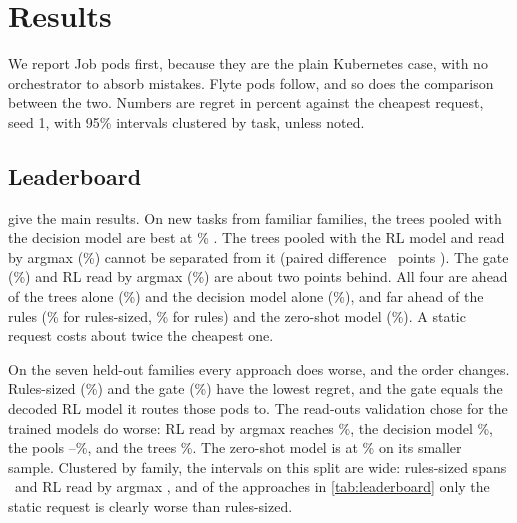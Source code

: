 \section{Results}
\label{sec:results}




We report Job pods first, because they are the plain Kubernetes case, with no orchestrator to absorb mistakes.
Flyte pods follow, and so does the comparison between the two. Numbers are regret in percent against the cheapest
request, seed 1, with 95\% intervals clustered by task, unless noted.

\subsection{Leaderboard}
\label{sec:res-lead}

 give the main results. On new tasks from familiar families, the trees pooled
with the decision model are best at \rTestPoolDec\% \ciTestPoolDec. The trees pooled with the RL model and read by
argmax (\rTestPoolRLArg\%) cannot be separated from it (paired difference \vbTestPoolRLArg\ points
\vbTestPoolRLArgCI). The gate (\rTestGate\%) and RL read by argmax (\rTestRLArg\%) are about two points behind.
All four are ahead of the trees alone (\rTestTrees\%) and the decision model alone (\rTestDec\%), and far ahead of
the rules (\rTestSized\% for rules-sized, \rTestRules\% for rules) and the zero-shot model (\rTestZS\%). A static
request costs about twice the cheapest one.

On the seven held-out families every approach does worse, and the order changes. Rules-sized (\rUnseenSized\%) and
the gate (\rUnseenGate\%) have the lowest regret, and the gate equals the decoded RL model it routes those pods to.
The read-outs validation chose for the trained models do worse: RL read by argmax reaches \rUnseenRLArg\%, the
decision model \rUnseenDec\%, the pools \rUnseenPoolDec--\rUnseenPoolRLArg\%, and the trees \rUnseenTrees\%. The
zero-shot model is at \rUnseenZS\% on its smaller sample. Clustered by family, the intervals on this split are
wide: rules-sized spans \ciFamUnseenSized\ and RL read by argmax \ciFamUnseenRLArg, and of the approaches in
\cref{tab:leaderboard} only the static request is clearly worse than rules-sized.

\begin{table}[tbp]
\centering\small
\caption{Regret (\%) on Job pods for seed 1, with 95\% intervals clustered by task, and for the unseen split also
by family; regret on Flyte pods; dollar regret on Job pods; and the mean and range of Job regret over three
trainings. Each trained model is shown with the read-out validation chose (\cref{tab:readouts}). Bold marks the
approaches whose paired difference from the column's best includes zero. Each split has 5,095 Job pods for test
and 6,416 for unseen. $^\dagger$Zero-shot is scored on a sample of 130 test and 150 unseen Job pods
(\cref{tab:zs}) and is not compared for bold.}
\label{tab:leaderboard}
\resizebox{\linewidth}{!}{}
\end{table}

